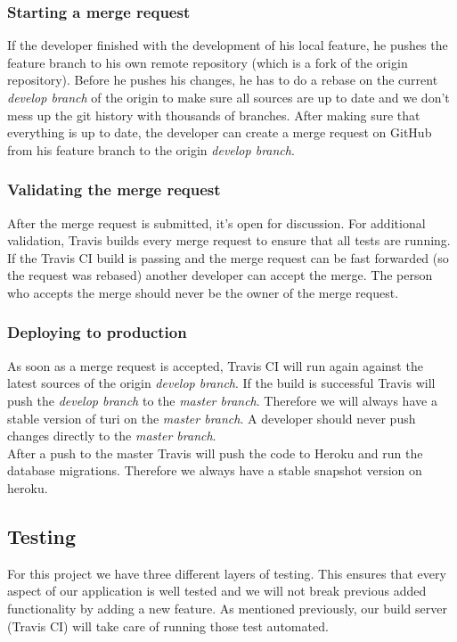 \documentclass[a4paper]{article}
\begin{document}
\subsubsection{Starting a merge request}
If the developer finished with the development of his local feature, he pushes the feature branch to his own remote repository (which is a fork of the origin repository). Before he pushes his changes, he has to do a rebase on the current \textit{develop branch} of the origin to make sure all sources are up to date and we don't mess up the git history with thousands of branches. After making sure that everything is up to date, the developer can create a merge request on GitHub from his feature branch to the origin \textit{develop branch}.

\subsubsection{Validating the merge request}
After the merge request is submitted, it's open for discussion. For additional validation, Travis builds every merge request to ensure that all tests are running. If the Travis CI build is passing and the merge request can be fast forwarded (so the request was rebased) another developer can accept the merge. The person who accepts the merge should never be the owner of the merge request.

\subsubsection{Deploying to production}
As soon as a merge request is accepted, Travis CI will run again against the latest sources of the origin \textit{develop branch}. If the build is successful Travis will push the \textit{develop branch} to the \textit{master branch}. Therefore we will always have a stable version of turi on the \textit{master branch}. A developer should never push changes directly to the \textit{master branch}.\\

\noindent
After a push to the master Travis will push the code to Heroku and run the database migrations. Therefore we always have a stable snapshot version on heroku.

\subsection{Testing}
For this project we have three different layers of testing. This ensures that every aspect of our application is well tested and we will not break previous added functionality by adding a new feature. As mentioned previously, our build server (Travis CI) will take care of running those test automated.
\end{document}
